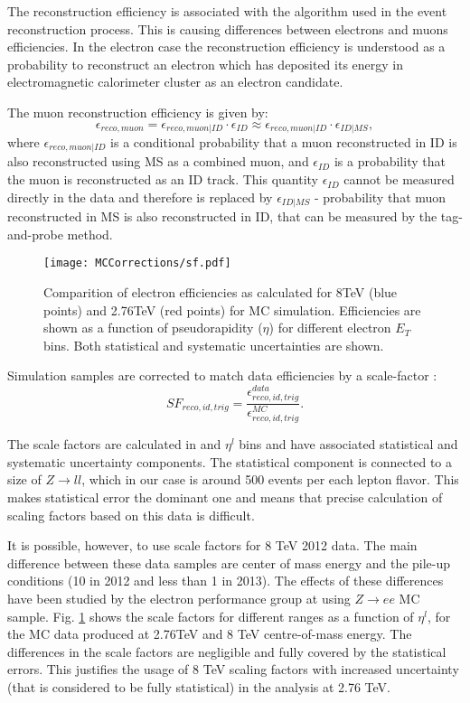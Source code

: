 The reconstruction efficiency is associated with the algorithm used in the event reconstruction process. This is causing differences between electrons and muons efficiencies. In the electron case the reconstruction efficiency is understood as a probability to reconstruct an electron which has deposited its energy in electromagnetic calorimeter cluster as an electron candidate.  

The muon reconstruction efficiency is given by:
\begin{equation}
\epsilon_{reco,muon} = \epsilon_{reco,muon|ID} \cdot \epsilon_{ID} \approx \epsilon_{reco,muon|ID} \cdot \epsilon_{ID|MS},
\end{equation}
where $\epsilon_{reco,muon|ID}$ is a conditional probability that a muon reconstructed in ID is also reconstructed using MS as a combined muon, and  $\epsilon_{ID}$ is a probability that the muon is reconstructed as an ID track. This quantity $\epsilon_{ID}$ cannot be measured directly  in the data and therefore is replaced by $\epsilon_{ID|MS}$ - probability that muon reconstructed in MS is also reconstructed in ID, that can be measured by the tag-and-probe method. 

\begin{figure}[t]
\centering
\texttt{[image: MCCorrections/sf.pdf]}
\caption{Comparition of electron efficiencies as calculated for 8TeV (blue points) and 2.76TeV (red points) for MC simulation. Efficiencies are shown as a function of pseudorapidity ($\eta$) for different electron $E_T$ bins. Both statistical and systematic uncertainties are shown. }
\label{eff_comp}
\end{figure}
Simulation samples are corrected to match data efficiencies by a scale-factor :
\begin{equation}
SF_{reco,id,trig}=\frac{\epsilon^{data}_{reco,id,trig}}{\epsilon^{MC}_{reco,id,trig}}.
\end{equation}

The scale factors are calculated in \ptl and $\eta^{l}$ bins and have associated statistical and systematic uncertainty components. The statistical component is connected to a size of $Z\to ll$, which in our case is around 500 events per each lepton flavor. This makes statistical error the dominant one and means that precise calculation of scaling factors based on this data is difficult.

It is possible, however, to use scale factors for 8 TeV 2012 data. The main difference between these data samples are center of mass energy and the pile-up conditions (10 in 2012 and less than 1 in 2013). The effects of these differences have been studied by the electron performance group at \atlas using $Z\to ee$ MC sample. Fig. \ref{eff_comp} shows the scale factors for different \ptl ranges as a function of $\eta^{l}$, for the MC data produced at 2.76TeV and 8 TeV centre-of-mass energy. The differences in the scale factors are negligible and fully covered by the statistical errors. This justifies the usage of 8 TeV scaling factors with increased uncertainty (that is considered to be fully statistical) in the analysis at 2.76 TeV. 

